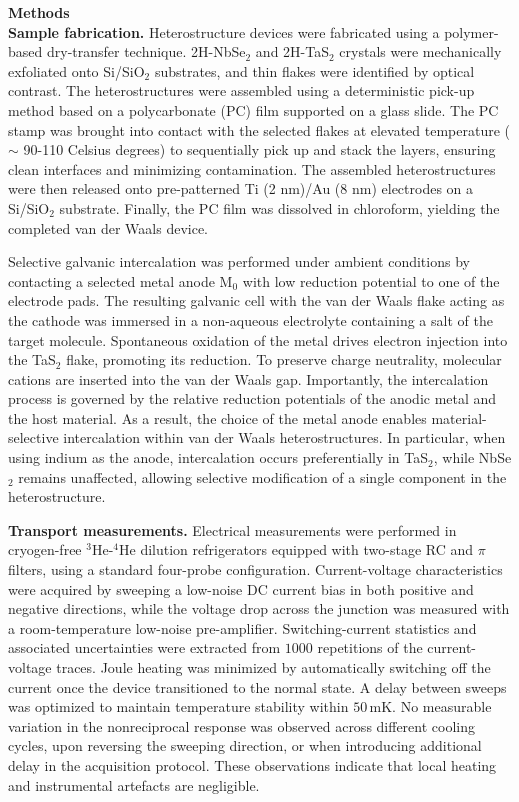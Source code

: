 \documentclass[twocolumn,secnumarabic,amssymb, nobibnotes, aps, prl, superscriptaddress]{revtex4-2}
\begin{document}
\vspace{0.5cm}

\noindent\large{\textbf{Methods}}\normalsize\\
\textbf{Sample fabrication.}
Heterostructure devices were fabricated using a polymer-based dry-transfer technique. 2H-NbSe$_2$ and 2H-TaS$_2$ crystals were mechanically exfoliated onto Si/SiO$_2$ substrates, and thin flakes were identified by optical contrast. The heterostructures were assembled using a deterministic pick-up method based on a polycarbonate (PC) film supported on a glass slide. The PC stamp was brought into contact with the selected flakes at elevated temperature ($\sim$ 90-110 Celsius degrees) to sequentially pick up and stack the layers, ensuring clean interfaces and minimizing contamination. The assembled heterostructures were then released onto pre-patterned Ti (2 nm)/Au (8 nm) electrodes on a Si/SiO$_2$ substrate. Finally, the PC film was dissolved in chloroform, yielding the completed van der Waals device. 

Selective galvanic intercalation was performed under ambient conditions by contacting a selected metal anode M$_0$ with low reduction potential to one of the electrode pads. The resulting galvanic cell with the van der Waals flake acting as the cathode was immersed in a non-aqueous electrolyte containing a salt of the target molecule. Spontaneous oxidation of the metal drives electron injection into the TaS$_2$ flake, promoting its reduction. To preserve charge neutrality, molecular cations are inserted into the van der Waals gap. Importantly, the intercalation process is governed by the relative reduction potentials of the anodic metal and the host material. As a result, the choice of the metal anode enables material-selective intercalation within van der Waals heterostructures. In particular, when using indium as the anode, intercalation occurs preferentially in TaS$_2$, while NbSe$_2$ remains unaffected, allowing selective modification of a single component in the heterostructure.

\noindent\textbf{Transport measurements.}
Electrical measurements were performed in
cryogen-free $^3$He-$^4$He dilution refrigerators equipped with two-stage RC and $\pi$ filters, using a standard four-probe configuration. Current-voltage characteristics were acquired by sweeping a low-noise DC current bias in both positive and negative directions, while the voltage drop across the junction was measured with a room-temperature low-noise pre-amplifier. 
Switching-current statistics and associated uncertainties were extracted from $1000$ repetitions of the current-voltage traces. Joule heating was minimized by automatically switching off the current once the device transitioned to the normal state. 
A delay between sweeps was optimized to maintain temperature stability within $50\, \text{mK}$. No measurable variation in the nonreciprocal response was observed across different cooling cycles, upon reversing the sweeping direction, or when introducing additional delay in the acquisition protocol. These observations indicate that local heating and instrumental artefacts are negligible.\\
\end{document}
